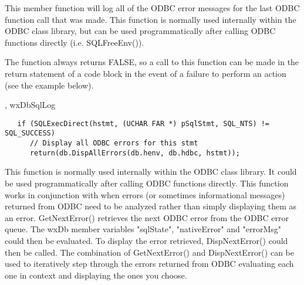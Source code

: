 




This member function will log all of the ODBC error messages for the last
ODBC function call that was made.  This function is normally used internally
within the ODBC class library, but can be used programmatically after calling
ODBC functions directly (i.e. SQLFreeEnv()).


The function always returns FALSE, so a call to this function can be made
in the return statement of a code block in the event of a failure to
perform an action (see the example below).


, wxDbSqlLog


\begin{verbatim}
   if (SQLExecDirect(hstmt, (UCHAR FAR *) pSqlStmt, SQL_NTS) != SQL_SUCCESS)
      // Display all ODBC errors for this stmt
      return(db.DispAllErrors(db.henv, db.hdbc, hstmt));
\end{verbatim}

\label{wxdbdispnexterror}



This function is normally used internally within the ODBC class library.
It could be used programmatically after calling ODBC functions directly.  This
function works in conjunction with  when errors (or
sometimes informational messages)  returned from ODBC need to be analyzed
rather than simply displaying them as an error.  GetNextError() retrieves
the next ODBC error from the ODBC error queue.  The wxDb member variables
"sqlState", "nativeError" and "errorMsg" could then be evaluated.  To
display the error retrieved, DispNextError() could then be called.
The combination of GetNextError() and DispNextError() can be used to
iteratively step through the errors returned from ODBC evaluating each
one in context and displaying the ones you choose.

